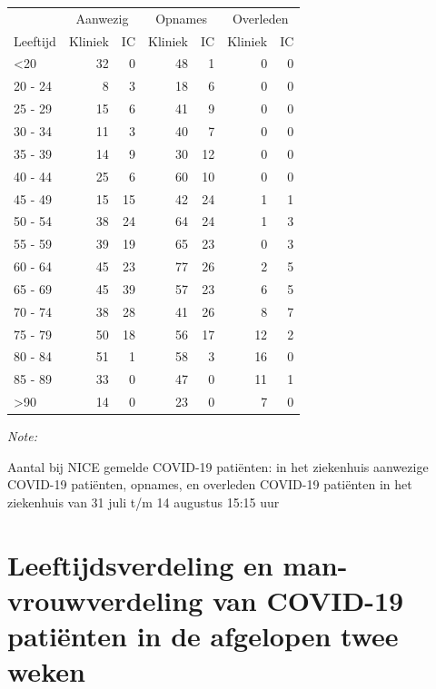 \documentclass[
  english,
  man,floatsintext]{apa6}
\begin{document}
\begin{table}
\centering\begingroup\fontsize{10}{12}\selectfont

\begin{threeparttable}
\begin{tabular}{lrrrrrr}
\toprule
\multicolumn{1}{c}{ } & \multicolumn{2}{c}{Aanwezig} & \multicolumn{2}{c}{Opnames} & \multicolumn{2}{c}{Overleden} \\
\cmidrule(l{3pt}r{3pt}){2-3} \cmidrule(l{3pt}r{3pt}){4-5} \cmidrule(l{3pt}r{3pt}){6-7}
Leeftijd & Kliniek & IC & Kliniek & IC & Kliniek & IC\\
\midrule
<20 & 32 & 0 & 48 & 1 & 0 & 0\\
20 - 24 & 8 & 3 & 18 & 6 & 0 & 0\\
25 - 29 & 15 & 6 & 41 & 9 & 0 & 0\\
30 - 34 & 11 & 3 & 40 & 7 & 0 & 0\\
35 - 39 & 14 & 9 & 30 & 12 & 0 & 0\\
40 - 44 & 25 & 6 & 60 & 10 & 0 & 0\\
45 - 49 & 15 & 15 & 42 & 24 & 1 & 1\\
50 - 54 & 38 & 24 & 64 & 24 & 1 & 3\\
55 - 59 & 39 & 19 & 65 & 23 & 0 & 3\\
60 - 64 & 45 & 23 & 77 & 26 & 2 & 5\\
65 - 69 & 45 & 39 & 57 & 23 & 6 & 5\\
70 - 74 & 38 & 28 & 41 & 26 & 8 & 7\\
75 - 79 & 50 & 18 & 56 & 17 & 12 & 2\\
80 - 84 & 51 & 1 & 58 & 3 & 16 & 0\\
85 - 89 & 33 & 0 & 47 & 0 & 11 & 1\\
>90 & 14 & 0 & 23 & 0 & 7 & 0\\
\bottomrule
\end{tabular}
\begin{tablenotes}
\item \textit{Note: } 
\item Aantal bij NICE gemelde COVID-19 patiënten: in het ziekenhuis aanwezige COVID-19 patiënten, opnames, en overleden COVID-19 patiënten in het ziekenhuis van 31 juli t/m 14 augustus 15:15 uur
\end{tablenotes}
\end{threeparttable}
\endgroup{}
\end{table}

\newpage

\hypertarget{leeftijdsverdeling-en-man-vrouwverdeling-van-covid-19-patiuxebnten-in-de-afgelopen-twee-weken}{%
\section{Leeftijdsverdeling en man-vrouwverdeling van COVID-19 patiënten in de afgelopen twee weken}\label{leeftijdsverdeling-en-man-vrouwverdeling-van-covid-19-patiuxebnten-in-de-afgelopen-twee-weken}}
\end{document}
